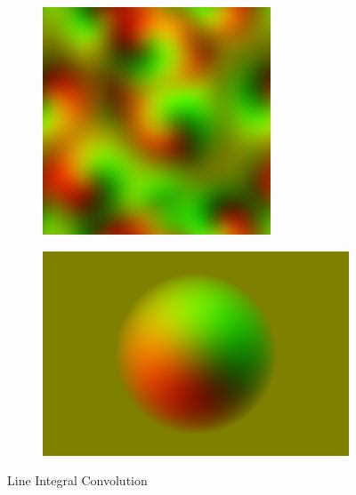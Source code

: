 \begin{figure}
\begin{subfigure}{0.45\textwidth}
	\end{subfigure}
	\newline 
	\par\bigskip\par\bigskip\par\bigskip
	\begin{subfigure}{0.45\textwidth}
		\includegraphics[height=\textwidth,width=\textwidth]{figures/mylic3.jpg}
	\end{subfigure}
	\hfill
	\begin{subfigure}{0.45\textwidth}
		\includegraphics[height=\textwidth,width=\textwidth]{figures/mylic4.png}
	\end{subfigure}
	\caption{Line Integral Convolution}
	\label{fig:mylic}
\end{figure}


